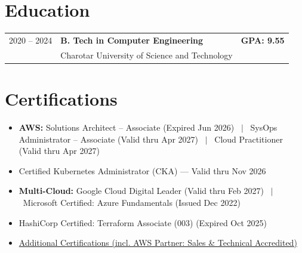 \documentclass[a4paper,10.999999pt]{article}
\begin{document}

    \section{Education}

    \begin{tabularx}{\linewidth}{@{}l X r@{}}
    2020 -- 2024 & \textbf{B. Tech in Computer Engineering} & \textbf{GPA: 9.55} \\
    & Charotar University of Science and Technology & \\
    \end{tabularx}

    \vspace{3pt}


    \section{Certifications}

    \begin{itemize}[leftmargin=1.5em, itemsep=2pt, label=\raisebox{0.25ex}{\tiny$\circ$}]
    \item \textbf{AWS:} Solutions Architect – Associate (Expired Jun 2026) \ $|$ \ SysOps Administrator – Associate (Valid thru Apr 2027) \ $|$ \ Cloud Practitioner (Valid thru Apr 2027)
    \item Certified Kubernetes Administrator (CKA) — Valid thru Nov 2026
    \item \textbf{Multi-Cloud:} Google Cloud Digital Leader (Valid thru Feb 2027) \ $|$ \ Microsoft Certified: Azure Fundamentals (Issued Dec 2022)
    \item HashiCorp Certified: Terraform Associate (003) (Expired Oct 2025)
    \item \href{https://www.credly.com/users/kelvi-manavadaria}{Additional Certifications (incl. AWS Partner: Sales \& Technical Accredited)}
    \end{itemize}

    \vspace{1.5pt}

    
\end{document}
